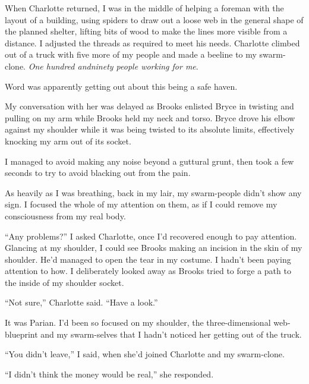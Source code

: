 When Charlotte returned, I was in the middle of helping a foreman with the layout of a building, using spiders to draw out a loose web in the general shape of the planned shelter, lifting bits of wood to make the lines more visible from a distance.  I adjusted the threads as required to meet his needs.  Charlotte climbed out of a truck with five more of my people and made a beeline to my swarm-clone.  \emph{One hundred and}\emph{ninety people working for me}.



Word was apparently getting out about this being a safe haven.



My conversation with her was delayed as Brooks enlisted Bryce in twisting and pulling on my arm while Brooks held my neck and torso.  Bryce drove his elbow against my shoulder while it was being twisted to its absolute limits, effectively knocking my arm out of its socket.



I managed to avoid making any noise beyond a guttural grunt, then took a few seconds to try to avoid blacking out from the pain.



As heavily as I was breathing, back in my lair, my swarm-people didn't show any sign.  I focused the whole of my attention on them, as if I could remove my consciousness from my real body.



``Any problems?''  I asked Charlotte, once I'd recovered enough to pay attention.  Glancing at my shoulder, I could see Brooks making an incision in the skin of my shoulder.  He'd managed to open the tear in my costume.  I hadn't been paying attention to how.  I deliberately looked away as Brooks tried to forge a path  to the inside of my shoulder socket.



``Not sure,'' Charlotte said.  ``Have a look.''



It was Parian.  I'd been so focused on my shoulder, the three-dimensional web-blueprint and my swarm-selves that I hadn't noticed her getting out of the truck.



``You didn't leave,'' I said, when she'd joined Charlotte and my swarm-clone.



``I didn't think the money would be real,'' she responded.



